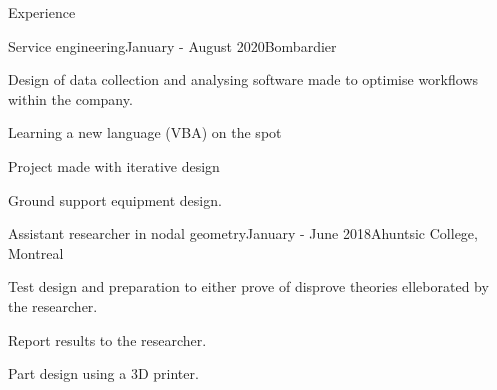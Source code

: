 \documentclass{resume} %
\begin{document}
	
	
	\begin{rSection}{Experience}
		
		\begin{rSubsection}{Service engineering}{January - August 2020}{Bombardier}{}{}
			\item Design of data collection and analysing software made to optimise workflows within the company.
			\item Learning a new language (VBA) on the spot
			\item Project made with iterative design
			\item Ground support equipment design.
		\end{rSubsection}
		
		\begin{rSubsection}{Assistant researcher in nodal geometry}{January - June 2018}{Ahuntsic College, Montreal}{}
			\item   Test design and preparation to either prove of disprove theories elleborated by the researcher.
			\item   Report results to the researcher.
			\item   Part design using a 3D printer.
		\end{rSubsection}
		
		
	\end{rSection}
	
\end{document}
